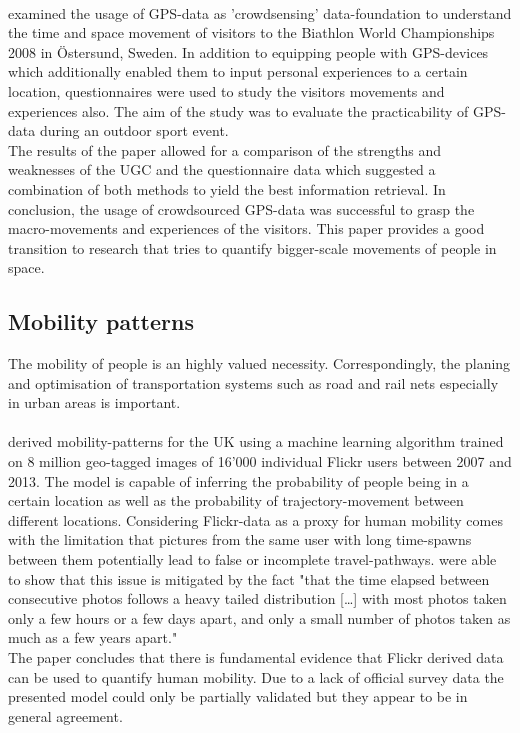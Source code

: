 \paragraph*{\textcite{Pettersson2011}} examined the usage of GPS-data as 'crowdsensing' data-foundation to understand the time and space movement of visitors to the Biathlon World Championships 2008 in \"Ostersund, Sweden. In addition to equipping people with GPS-devices which additionally enabled them to input personal experiences to a certain location, questionnaires were used to study the visitors movements and experiences also. The aim of the study was to evaluate the practicability of GPS-data during an outdoor sport event. \\
The results of the paper allowed for a comparison of the strengths and weaknesses of the UGC and the questionnaire data which suggested a combination of both methods to yield the best information retrieval. In conclusion, the usage of crowdsourced GPS-data was successful to grasp the macro-movements and experiences of the visitors. This paper provides a good transition to research that tries to quantify bigger-scale movements of people in space.

\subsection{Mobility patterns}
The mobility of people is an highly valued necessity. Correspondingly, the planing and optimisation of transportation systems such as road and rail nets especially in urban areas is important. 


\paragraph*{\textcite{Barchiesi2015}} derived mobility-patterns for the UK using a machine learning algorithm trained on 8 million geo-tagged images of 16'000 individual Flickr users between 2007 and 2013. The model is capable of inferring the probability of people being in a certain location as well as the probability of trajectory-movement between different locations. Considering Flickr-data as a proxy for human mobility comes with the limitation that pictures from the same user with long time-spawns between them potentially lead to false or incomplete travel-pathways. \textcite[p.7]{Barchiesi2015} were able to show that this issue is mitigated by the fact "that the time elapsed between consecutive photos follows a heavy tailed distribution [\dots] with most photos taken only a few hours or a few days apart, and only a small number of photos taken as much as a few years apart." \\
The paper concludes that there is fundamental evidence that Flickr derived data can be used to quantify human mobility. Due to a lack of official survey data the presented model could only be partially validated but they appear to be in general agreement.

